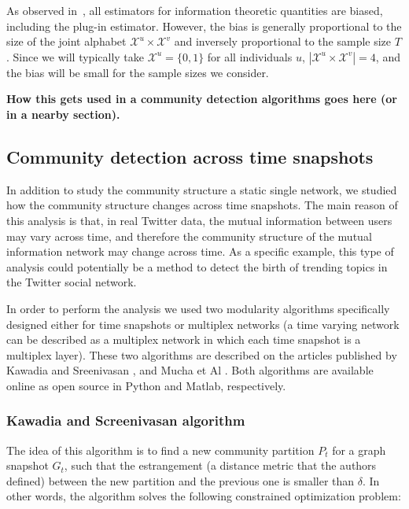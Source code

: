 \documentclass[12pt]{article}
\begin{document}
As observed in~\cite{paninski2003estimation}, all estimators for information theoretic quantities are biased, including the plug-in estimator. However, the bias is generally proportional to the size of the joint alphabet $\mathcal{X}^{u} \times \mathcal{X}^{v}$ and inversely proportional to the sample size $T$. Since we will typically take $\mathcal{X}^{u} = \{0, 1\}$ for all individuals $u$, $|\mathcal{X}^{u} \times \mathcal{X}^{v}| = 4$, and the bias will be small for the sample sizes we consider.

\textbf{How this gets used in a community detection algorithms goes here (or in a nearby section).}

\subsection{Community detection across time snapshots}

In addition to study the community structure a static single network, we studied how the community structure changes across time snapshots. The main reason of this analysis is that, in real Twitter data,  the mutual information between users may vary across time, and therefore the community structure of the mutual information network may change across time. As
a specific example, this type of analysis could potentially be a method to detect the birth of trending topics in the Twitter social network.

In order to perform the analysis we used two modularity algorithms
specifically designed either for time snapshots or multiplex networks (a time varying network
can be described as a multiplex network in which each time snapshot is a multiplex layer).
These two algorithms are described on the articles published by Kawadia and Sreenivasan
\cite{kawadia2012sequential}, and Mucha et Al \cite{Mucha14052010}. Both algorithms are available
online as open source in Python and Matlab, respectively. 

\subsubsection{Kawadia and Screenivasan algorithm}

The idea of this algorithm is to find a new community partition $P_t$ for a graph snapshot $G_t$, such that the estrangement (a distance
metric that the authors defined) between the new partition and the
previous one is smaller than $\delta$. In other words, the algorithm solves
the following constrained optimization problem:
\end{document}
